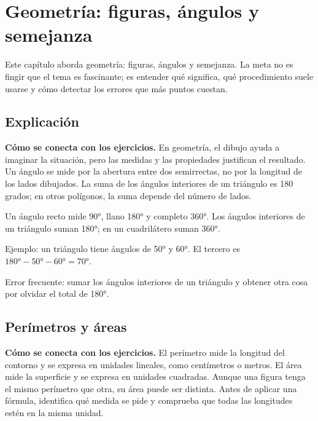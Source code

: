 \documentclass[10pt,oneside,openany]{book}
\begin{document}
\chapter{Geometría: figuras, ángulos y semejanza}

\begin{idea}
Este capítulo aborda geometría: figuras, ángulos y semejanza. La meta no es fingir que el tema es fascinante; es entender qué significa, qué procedimiento suele usarse y cómo detectar los errores que más puntos cuestan.
\end{idea}

\section{Explicación}

\textbf{Cómo se conecta con los ejercicios.} En geometría, el dibujo ayuda a imaginar la situación, pero las medidas y las propiedades justifican el resultado. Un ángulo se mide por la abertura entre dos semirrectas, no por la longitud de los lados dibujados. La suma de los ángulos interiores de un triángulo es 180 grados; en otros polígonos, la suma depende del número de lados.

Un ángulo recto mide 90°, llano 180° y completo 360°. Los ángulos interiores de un triángulo suman 180°; en un cuadrilátero suman 360°.



\begin{ejemplo}
Ejemplo: un triángulo tiene ángulos de 50° y 60°. El tercero es $180°-50°-60°=70°$.
\end{ejemplo}

\begin{ojo}
Error frecuente: sumar los ángulos interiores de un triángulo y obtener otra cosa por olvidar el total de 180°.
\end{ojo}



\section{Perímetros y áreas}

\textbf{Cómo se conecta con los ejercicios.} El perímetro mide la longitud del contorno y se expresa en unidades lineales, como centímetros o metros. El área mide la superficie y se expresa en unidades cuadradas. Aunque una figura tenga el mismo perímetro que otra, su área puede ser distinta. Antes de aplicar una fórmula, identifica qué medida se pide y comprueba que todas las longitudes estén en la misma unidad.
\end{document}
